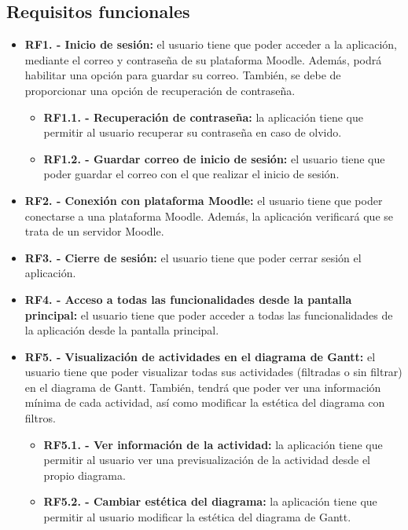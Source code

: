 \subsection{Requisitos funcionales}
\begin{itemize}
    \item \textbf{RF1. - Inicio de sesión:} el usuario tiene que poder acceder a la aplicación, mediante el correo y contraseña de su plataforma Moodle. Además, podrá habilitar una opción para guardar su correo. También, se debe de proporcionar una opción de recuperación de contraseña.
        \begin{itemize}
            \item \textbf{RF1.1. - Recuperación de contraseña:} la aplicación tiene que permitir al usuario recuperar su contraseña en caso de olvido.
            \item \textbf{RF1.2. - Guardar correo de inicio de sesión:} el usuario tiene que poder guardar el correo con el que realizar el inicio de sesión.
        \end{itemize}
    \item \textbf{RF2. - Conexión con plataforma Moodle:} el usuario tiene que poder conectarse a una plataforma Moodle. Además, la aplicación verificará que se trata de un servidor Moodle.
    \item \textbf{RF3. - Cierre de sesión:} el usuario tiene que poder cerrar sesión el aplicación.
    \item \textbf{RF4. - Acceso a todas las funcionalidades desde la pantalla principal:} el usuario tiene que poder acceder a todas las funcionalidades de la aplicación desde la pantalla principal.
    \item \textbf{RF5. - Visualización de actividades en el diagrama de Gantt:} el usuario tiene que poder visualizar todas sus actividades (filtradas o sin filtrar) en el diagrama de Gantt. También, tendrá que poder ver una información mínima de cada actividad, así como modificar la estética del diagrama con filtros.
        \begin{itemize}
            \item \textbf{RF5.1. - Ver información de la actividad:} la aplicación tiene que permitir al usuario ver una previsualización de la actividad desde el propio diagrama.
            \item \textbf{RF5.2. - Cambiar estética del diagrama:} la aplicación tiene que permitir al usuario modificar la estética del diagrama de Gantt. 
        \end{itemize}

\end{itemize}

